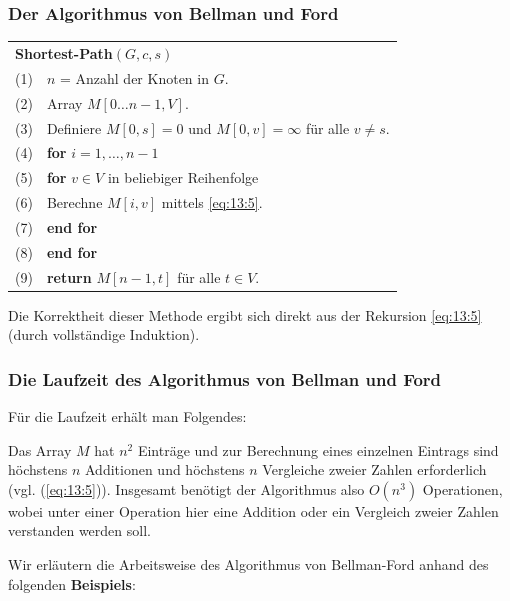 \documentclass[smaller,xcolor=dvipsnames]{beamer}
\begin{document}
\begin{frame}
\frametitle{Der Algorithmus von Bellman und Ford}
\begin{center}
\begin{tabular}{rl}
\multicolumn{2}{l}{\textbf{Shortest-Path$(G,c,s)$}} \\
 (1)& $n$ = Anzahl der Knoten in $G$.\\
 (2)& Array $M[0\ldots n-1,V]$. \\
 (3)& Definiere $M[0,s]=0$ und $M[0,v]=\infty$ für alle $v \neq s$. \\
 (4)& \textbf{for} $i=1,\ldots,n-1$ \\ 
 (5)& \qquad \textbf{for} $v \in V$ in beliebiger Reihenfolge \\
 (6)& \qquad\qquad Berechne $M[i,v]$ mittels \eqref{eq:13:5}. \\
 (7)& \qquad \textbf{end for} \\
 (8)& \textbf{end for} \\
 (9)& \textbf{return} $M[n-1,t]$ für alle $t \in V$.
\end{tabular}
\end{center}

Die Korrektheit dieser Methode ergibt sich direkt aus der Rekursion \eqref{eq:13:5} (durch vollständige Induktion). 
\end{frame}

\begin{frame}
\frametitle{Die Laufzeit des Algorithmus von Bellman und Ford}
Für die Laufzeit erhält man Folgendes: \\ \medskip
 
Das Array $M$ hat $n^2$ Einträge und zur Berechnung eines einzelnen Eintrags sind höchstens $n$ Additionen und höchstens $n$ Vergleiche zweier Zahlen erforderlich (vgl. (\ref{eq:13:5})). Insgesamt benötigt der Algorithmus also $O(n^3)$ Operationen, wobei unter einer Operation hier eine Addition oder ein Vergleich zweier Zahlen verstanden werden soll. \\ \medskip

Wir erläutern die Arbeitsweise des Algorithmus von Bellman-Ford anhand des folgenden \textbf{Beispiels}:
\end{frame}
\end{document}
